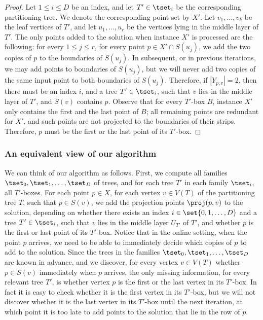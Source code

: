 \documentclass[11pt]{article}
\numberwithin{equation}{section}
\theoremstyle{definition}
\theoremstyle{plain}
\begin{document}
\begin{proof}
	Let $1\leq i\leq D$ be an index, and let $T'\in \tset_i$ be the corresponding partitioning tree. We denote the corresponding point set by $X'$. Let $v_1,\ldots,v_k$ be the leaf vertices of $T'$, and let $u_1,\ldots,u_r$ be the vertices lying in the middle layer of $T'$. The only points added to the solution when instance $X'$ is processed are the following: for every $1\leq j\leq r$, for every point $p\in X'\cap S(u_j)$, we add the two copies of $p$ to the boundaries of $S(u_j)$. In subsequent, or in previous iterations, we may add points to boundaries of $S(u_j)$, but we will never add two copies of the same input point to both boundaries of $S(u_j)$. Therefore, if $|Y_{p,v}|=2$, then there must be an index $i$, and a tree $T'\in \tset_i$, such that $v$ lies in the middle layer of $T'$, and $S(v)$ contains $p$. Observe that for every $T'$-box $B$, instance $X'$ only contains the first and the last point of $B$; all remaining points are redundant for $X'$, and such points are not projected to the boundaries of their strips. Therefore, $p$ must be the first or the last point of its $T'$-box.
	\end{proof}



\subsubsection{An equivalent view of our algorithm}


We can think of our algorithm as follows.
First, we compute all families $\tset_0,\tset_1, \ldots, \tset_D$ of trees, and for each tree $T'$ in each family $\tset_i$, all $T'$-boxes.
For each point $p \in X$, for each vertex $v \in V(T)$ of the partitioning tree $T$, such that $p\in S(v)$, we add the projection points $\proj(p,v)$ to the solution, depending on whether there exists an index $i \in \set{0,1,\ldots, D}$ and a tree $T' \in \tset_i$, such that $v$ lies in the middle layer $U_{T'}$ of $T'$,  and whether $p$ is the first or last point of its $T'$-box. Notice that in the online setting, when the point $p$ arrives, we need to be able to immediately decide which copies of $p$ to add to the solution. Since the trees in the families $\tset_0,\tset_1,\ldots,\tset_D$ are known in advance, and we discover, for every vertex $v\in V(T)$ whether $p\in S(v)$ immediately when $p$ arrives, the only missing information, for every relevant tree $T'$, is whether vertex $p$ is the first or the last vertex in its $T'$-box. In fact it is easy to check whether it is the first vertex in its $T'$-box, but we will not discover whether it is the last vertex in its $T'$-box until the next iteration, at which point it is too late to add points to the solution that lie in the row of $p$.
\end{document}
